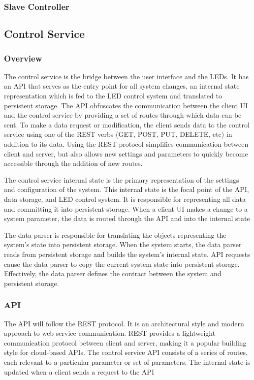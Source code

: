 \documentclass[onecolumn, draftclsnofoot,10pt, compsoc]{IEEEtran}
\begin{document}
			\subsubsection{Slave Controller}


		\subsection{Control Service}
			\subsubsection{Overview}
			The control service is the bridge between the user interface and the LEDs.
			It has an API that serves as the entry point for all system changes, an internal state representation which is fed to the LED control system and translated to persistent storage.
			The API obfuscates the communication between the client UI and the control service by providing a set of routes through which data can be sent.
			To make a data request or modification, the client sends data to the control service using one of the REST verbs (GET, POST, PUT, DELETE, etc) in addition to its data.
			Using the REST protocol simplifies communication between client and server, but also allows new settings and parameters to quickly become accessible through the addition of new routes.

			The control service internal state is the primary representation of the settings and configuration of the system.
			This internal state is the focal point of the API, data storage, and LED control system.
			It is responsible for representing all data and committing it into persistent storage.
			When a client UI makes a change to a system parameter, the data is routed through the API and into the internal state

			The data parser is responsible for translating the objects representing the system's state into persistent storage.
			When the system starts, the data parser reads from persistent storage and builds the system's internal state.
			API requests cause the data parser to copy the current system state into persistent storage.
			Effectively, the data parser defines the contract between the system and persistent storage.

			\subsubsection{API}
			The API will follow the REST protocol. It is an architectural style and modern approach to web service communication. \cite{rest1}
			REST provides a lightweight communication protocol between client and server, making it a popular building style for cloud-based APIs.
			The control service API consists of a series of routes, each relevant to a particular parameter or set of parameters.
			The internal state is updated when a client sends a request to the API
\end{document}
